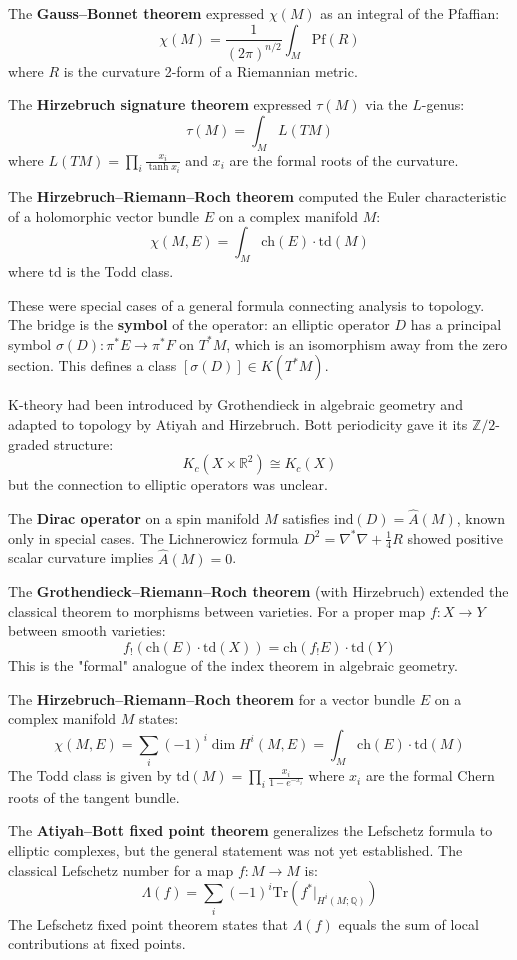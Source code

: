 The \textbf{Gauss--Bonnet theorem} expressed $\chi(M)$ as an integral of the
Pfaffian:
\[\chi(M) = \frac{1}{(2\pi)^{n/2}} \int_M \text{Pf}(R)\]
where $R$ is the curvature 2-form of a Riemannian metric.

The \textbf{Hirzebruch signature theorem} expressed $\tau(M)$ via the $L$-genus:
\[\tau(M) = \int_M L(TM)\]
where $L(TM) = \prod_i \frac{x_i}{\tanh x_i}$ and $x_i$ are the formal roots
of the curvature.

The \textbf{Hirzebruch--Riemann--Roch theorem} computed the Euler characteristic
of a holomorphic vector bundle $E$ on a complex manifold $M$:
\[\chi(M, E) = \int_M \text{ch}(E) \cdot \text{td}(M)\]
where $\text{td}$ is the Todd class.

These were special cases of a general formula connecting analysis to topology.
The bridge is the \textbf{symbol} of the operator: an elliptic operator $D$ has
a principal symbol $\sigma(D): \pi^*E \to \pi^*F$ on $T^*M$, which is an
isomorphism away from the zero section. This defines a class
$[\sigma(D)] \in K(T^*M)$.

K-theory had been introduced by Grothendieck in algebraic geometry and adapted
to topology by Atiyah and Hirzebruch. Bott periodicity gave it its
$\mathbb{Z}/2$-graded structure:
\[K_c(X \times \mathbb{R}^2) \cong K_c(X)\]
but the connection to elliptic operators was unclear.

The \textbf{Dirac operator} on a spin manifold $M$ satisfies
$\text{ind}(D) = \widehat{A}(M)$, known only in special cases. The
Lichnerowicz formula $D^2 = \nabla^*\nabla + \frac{1}{4}R$ showed positive
scalar curvature implies $\widehat{A}(M) = 0$.

The \textbf{Grothendieck--Riemann--Roch theorem} (with Hirzebruch) extended
the classical theorem to morphisms between varieties. For a proper map
$f: X \to Y$ between smooth varieties:
\[f_!(\text{ch}(E) \cdot \text{td}(X)) = \text{ch}(f_!E) \cdot \text{td}(Y)\]
This is the "formal" analogue of the index theorem in algebraic geometry.

The \textbf{Hirzebruch--Riemann--Roch theorem} for a vector bundle $E$ on a
complex manifold $M$ states:
\[\chi(M, E) = \sum_i (-1)^i \dim H^i(M, E) = \int_M \text{ch}(E) \cdot \text{td}(M)\]
The Todd class is given by $\text{td}(M) = \prod_i \frac{x_i}{1 - e^{-x_i}}$
where $x_i$ are the formal Chern roots of the tangent bundle.

The \textbf{Atiyah--Bott fixed point theorem} generalizes the Lefschetz formula
to elliptic complexes, but the general statement was not yet established.
The classical Lefschetz number for a map $f: M \to M$ is:
\[\Lambda(f) = \sum_i (-1)^i \text{Tr}(f^*|_{H^i(M;\mathbb{Q})})\]
The Lefschetz fixed point theorem states that $\Lambda(f)$ equals the sum
of local contributions at fixed points.

